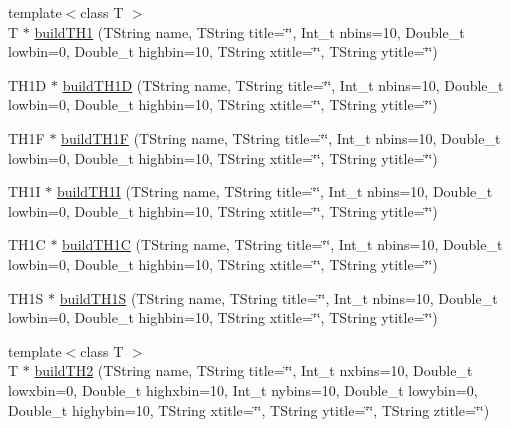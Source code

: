 \begin{DoxyCompactItemize}
\item 
{\footnotesize template$<$class T $>$ }\\T $\ast$ \hyperlink{namespace_h_a_l_afa5eba945570c465a048a363bf4393ae}{build\-T\-H1} (T\-String name, T\-String title=\char`\"{}\char`\"{}, Int\-\_\-t nbins=10, Double\-\_\-t lowbin=0, Double\-\_\-t highbin=10, T\-String xtitle=\char`\"{}\char`\"{}, T\-String ytitle=\char`\"{}\char`\"{})
\item 
T\-H1\-D $\ast$ \hyperlink{namespace_h_a_l_af95b935ec6a0d83d3361e2e6dac98466}{build\-T\-H1\-D} (T\-String name, T\-String title=\char`\"{}\char`\"{}, Int\-\_\-t nbins=10, Double\-\_\-t lowbin=0, Double\-\_\-t highbin=10, T\-String xtitle=\char`\"{}\char`\"{}, T\-String ytitle=\char`\"{}\char`\"{})
\item 
T\-H1\-F $\ast$ \hyperlink{namespace_h_a_l_a4f865f55ea949ac6b2dbd6091976f2ff}{build\-T\-H1\-F} (T\-String name, T\-String title=\char`\"{}\char`\"{}, Int\-\_\-t nbins=10, Double\-\_\-t lowbin=0, Double\-\_\-t highbin=10, T\-String xtitle=\char`\"{}\char`\"{}, T\-String ytitle=\char`\"{}\char`\"{})
\item 
T\-H1\-I $\ast$ \hyperlink{namespace_h_a_l_a696367177984e51ef10f0e764771c443}{build\-T\-H1\-I} (T\-String name, T\-String title=\char`\"{}\char`\"{}, Int\-\_\-t nbins=10, Double\-\_\-t lowbin=0, Double\-\_\-t highbin=10, T\-String xtitle=\char`\"{}\char`\"{}, T\-String ytitle=\char`\"{}\char`\"{})
\item 
T\-H1\-C $\ast$ \hyperlink{namespace_h_a_l_aecb2c6913e187ade28fdd059bb9c0ed1}{build\-T\-H1\-C} (T\-String name, T\-String title=\char`\"{}\char`\"{}, Int\-\_\-t nbins=10, Double\-\_\-t lowbin=0, Double\-\_\-t highbin=10, T\-String xtitle=\char`\"{}\char`\"{}, T\-String ytitle=\char`\"{}\char`\"{})
\item 
T\-H1\-S $\ast$ \hyperlink{namespace_h_a_l_ab6b1c43a147b298e85cb687d847e7773}{build\-T\-H1\-S} (T\-String name, T\-String title=\char`\"{}\char`\"{}, Int\-\_\-t nbins=10, Double\-\_\-t lowbin=0, Double\-\_\-t highbin=10, T\-String xtitle=\char`\"{}\char`\"{}, T\-String ytitle=\char`\"{}\char`\"{})
\item 
{\footnotesize template$<$class T $>$ }\\T $\ast$ \hyperlink{namespace_h_a_l_a60c11c0b80005ea4220a2e4904530f62}{build\-T\-H2} (T\-String name, T\-String title=\char`\"{}\char`\"{}, Int\-\_\-t nxbins=10, Double\-\_\-t lowxbin=0, Double\-\_\-t highxbin=10, Int\-\_\-t nybins=10, Double\-\_\-t lowybin=0, Double\-\_\-t highybin=10, T\-String xtitle=\char`\"{}\char`\"{}, T\-String ytitle=\char`\"{}\char`\"{}, T\-String ztitle=\char`\"{}\char`\"{})

\end{DoxyCompactItemize}
